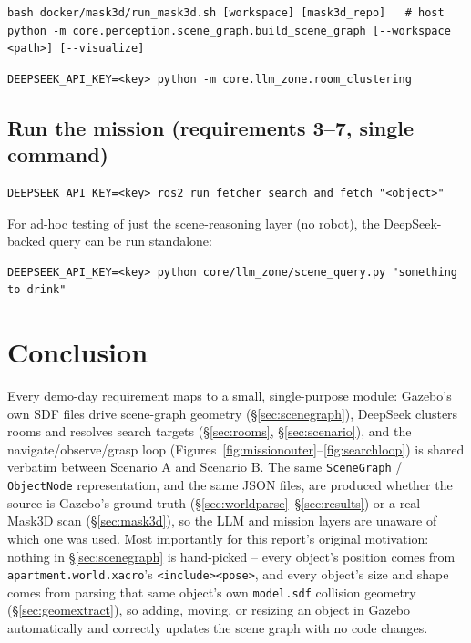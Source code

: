 \documentclass[11pt]{article}
\begin{document}
\begin{lstlisting}[style=sh,caption={Requirement~9: scene graph from a real RGB-D scan (Section~\ref{sec:mask3d})}]
bash docker/mask3d/run_mask3d.sh [workspace] [mask3d_repo]   # host
python -m core.perception.scene_graph.build_scene_graph [--workspace <path>] [--visualize]
\end{lstlisting}

\begin{lstlisting}[style=sh,caption={Requirement~2: room clustering (Section~\ref{sec:rooms})}]
DEEPSEEK_API_KEY=<key> python -m core.llm_zone.room_clustering
\end{lstlisting}

\subsection{Run the mission (requirements 3--7, single command)}

\begin{lstlisting}[style=sh,caption={Requirement~10: single-command search and fetch (Section~\ref{sec:singlecmd})}]
DEEPSEEK_API_KEY=<key> ros2 run fetcher search_and_fetch "<object>"
\end{lstlisting}

For ad-hoc testing of just the scene-reasoning layer (no robot), the
DeepSeek-backed query can be run standalone:

\begin{lstlisting}[style=sh,caption={Scene query only (Section~\ref{sec:scenario})}]
DEEPSEEK_API_KEY=<key> python core/llm_zone/scene_query.py "something to drink"
\end{lstlisting}

\section{Conclusion}

Every demo-day requirement maps to a small, single-purpose module: Gazebo's
own SDF files drive scene-graph geometry (\S\ref{sec:scenegraph}), DeepSeek
clusters rooms and resolves search targets (\S\ref{sec:rooms},
\S\ref{sec:scenario}), and the navigate/observe/grasp loop
(Figures~\ref{fig:missionouter}--\ref{fig:searchloop}) is shared verbatim
between Scenario A and Scenario B. The same \texttt{SceneGraph} /
\texttt{ObjectNode} representation, and the same JSON files, are produced
whether the source is Gazebo's ground truth (\S\ref{sec:worldparse}--\S\ref{sec:results})
or a real Mask3D scan (\S\ref{sec:mask3d}), so the LLM and mission layers are
unaware of which one was used. Most importantly for this report's original
motivation: nothing in \S\ref{sec:scenegraph} is hand-picked -- every object's
position comes from \texttt{apartment.world.xacro}'s \texttt{<include><pose>},
and every object's size and shape comes from parsing that same object's own
\texttt{model.sdf} collision geometry (\S\ref{sec:geomextract}), so adding,
moving, or resizing an object in Gazebo automatically and correctly updates
the scene graph with no code changes.
\end{document}
